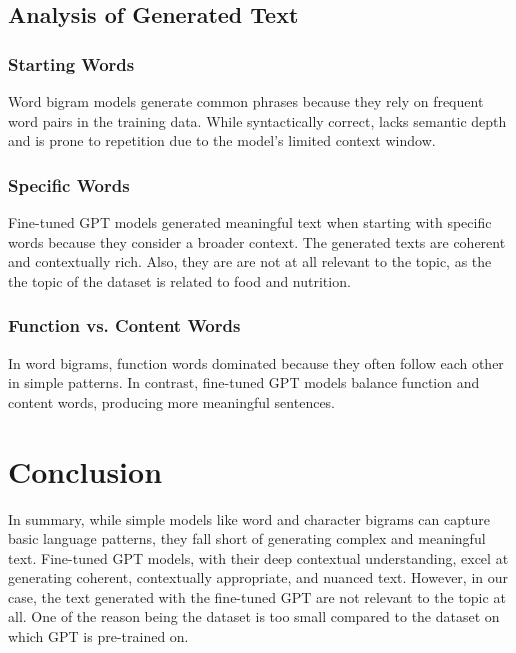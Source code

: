 \documentclass[journal,onecolumn]{IEEEtran}
\begin{document}
\subsection{Analysis of Generated Text}

\subsubsection{Starting Words}

Word bigram models generate common phrases because they rely on frequent word pairs in the training data. While syntactically correct, lacks semantic depth and is prone to repetition due to the model's limited context window.

\subsubsection{Specific Words}

Fine-tuned GPT models generated meaningful text when starting with specific words because they consider a broader context. The generated texts are coherent and contextually rich. Also, they are are not at all relevant to the topic, as the the topic of the dataset is related to food and nutrition.

\subsubsection{Function vs. Content Words}

In word bigrams, function words dominated because they often follow each other in simple patterns. In contrast, fine-tuned GPT models balance function and content words, producing more meaningful sentences.

\section{Conclusion}

In summary, while simple models like word and character bigrams can capture basic language patterns, they fall short of generating complex and meaningful text. Fine-tuned GPT models, with their deep contextual understanding, excel at generating coherent, contextually appropriate, and nuanced text. However, in our case, the text generated with the fine-tuned GPT are not relevant to the topic at all. One of the reason being the dataset is too small compared to the dataset on which GPT is pre-trained on. 
\end{document}
